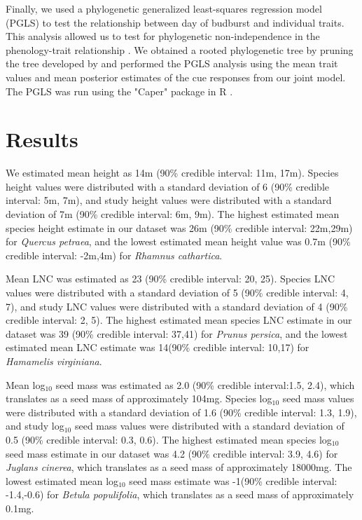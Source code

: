 \documentclass{article}\usepackage[]{graphicx}\usepackage[]{color}
\begin{document}

Finally, we used a phylogenetic generalized least-squares regression model (PGLS) to test the relationship between day of budburst and individual traits. This analysis allowed us to test for phylogenetic non-independence in the phenology-trait relationship \citep{Freckleton2002}. We obtained a rooted phylogenetic tree by pruning the tree developed by \citep{Smith2018} and performed the PGLS analysis using the mean trait values and mean posterior estimates of the cue responses from our joint model. The PGLS was run using the "Caper" package in R \citep{Orne2013}. \\

\section{Results}

We estimated mean height as 14m (90\% credible interval: 11m, 17m). Species height values were distributed with a standard deviation  of 6 (90\% credible interval: 5m, 7m), and study height values were distributed with a standard deviation of 7m (90\% credible interval: 6m, 9m). The highest estimated mean species height estimate in our dataset was 26m (90\% credible interval: 22m,29m) for \textit{Quercus petraea}, and the lowest estimated mean height value was 0.7m (90\% credible interval: -2m,4m) for \textit{Rhamnus cathartica}. 

Mean LNC was estimated as 23 (90\% credible interval: 20, 25). Species LNC values were distributed with a standard deviation  of 5 (90\% credible interval: 4, 7), and study LNC values were distributed with a standard deviation  of 4 (90\% credible interval: 2, 5). The highest estimated mean species LNC estimate in our dataset was 39 (90\% credible interval: 37,41) for \textit{Prunus persica}, and the lowest estimated mean LNC estimate was 14(90\% credible interval: 10,17) for \textit{Hamamelis virginiana}.

Mean log$_{10}$ seed mass was estimated as 2.0 (90\% credible interval:1.5, 2.4), which translates as a seed mass of approximately 104mg. Species log$_{10}$ seed mass values were distributed with a standard deviation  of 1.6 (90\% credible interval: 1.3, 1.9), and study log$_{10}$ seed mass values were distributed with a standard deviation  of 0.5 (90\% credible interval: 0.3, 0.6). The highest estimated mean species log$_{10}$ seed mass estimate in our dataset was 4.2 (90\% credible interval: 3.9, 4.6) for \textit{Juglans cinerea}, which translates as a seed mass of approximately 18000mg. The lowest estimated mean log$_{10}$ seed mass estimate was -1(90\% credible interval: -1.4,-0.6) for \textit{Betula populifolia}, which translates as a seed mass of approximately 0.1mg.
\end{document}
